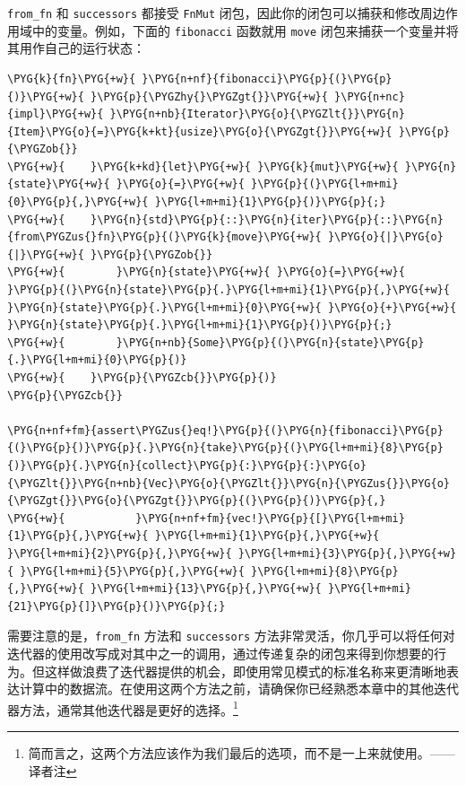 \texttt{from\_fn} 和 \texttt{successors} 都接受 \texttt{FnMut} 闭包，因此你的闭包可以捕获和修改周边作用域中的变量。例如，下面的 \texttt{fibonacci} 函数就用 \texttt{move} 闭包来捕获一个变量并将其用作自己的运行状态：

\begin{Verbatim}[commandchars=\\\{\},breaklines=true,breakanywhere=true,fontsize=\codefont,xleftmargin=17bp]
\PYG{k}{fn}\PYG{+w}{ }\PYG{n+nf}{fibonacci}\PYG{p}{(}\PYG{p}{)}\PYG{+w}{ }\PYG{p}{\PYGZhy{}\PYGZgt{}}\PYG{+w}{ }\PYG{n+nc}{impl}\PYG{+w}{ }\PYG{n+nb}{Iterator}\PYG{o}{\PYGZlt{}}\PYG{n}{Item}\PYG{o}{=}\PYG{k+kt}{usize}\PYG{o}{\PYGZgt{}}\PYG{+w}{ }\PYG{p}{\PYGZob{}}
\PYG{+w}{    }\PYG{k+kd}{let}\PYG{+w}{ }\PYG{k}{mut}\PYG{+w}{ }\PYG{n}{state}\PYG{+w}{ }\PYG{o}{=}\PYG{+w}{ }\PYG{p}{(}\PYG{l+m+mi}{0}\PYG{p}{,}\PYG{+w}{ }\PYG{l+m+mi}{1}\PYG{p}{)}\PYG{p}{;}
\PYG{+w}{    }\PYG{n}{std}\PYG{p}{::}\PYG{n}{iter}\PYG{p}{::}\PYG{n}{from\PYGZus{}fn}\PYG{p}{(}\PYG{k}{move}\PYG{+w}{ }\PYG{o}{|}\PYG{o}{|}\PYG{+w}{ }\PYG{p}{\PYGZob{}}
\PYG{+w}{        }\PYG{n}{state}\PYG{+w}{ }\PYG{o}{=}\PYG{+w}{ }\PYG{p}{(}\PYG{n}{state}\PYG{p}{.}\PYG{l+m+mi}{1}\PYG{p}{,}\PYG{+w}{ }\PYG{n}{state}\PYG{p}{.}\PYG{l+m+mi}{0}\PYG{+w}{ }\PYG{o}{+}\PYG{+w}{ }\PYG{n}{state}\PYG{p}{.}\PYG{l+m+mi}{1}\PYG{p}{)}\PYG{p}{;}
\PYG{+w}{        }\PYG{n+nb}{Some}\PYG{p}{(}\PYG{n}{state}\PYG{p}{.}\PYG{l+m+mi}{0}\PYG{p}{)}
\PYG{+w}{    }\PYG{p}{\PYGZcb{}}\PYG{p}{)}
\PYG{p}{\PYGZcb{}}

\PYG{n+nf+fm}{assert\PYGZus{}eq!}\PYG{p}{(}\PYG{n}{fibonacci}\PYG{p}{(}\PYG{p}{)}\PYG{p}{.}\PYG{n}{take}\PYG{p}{(}\PYG{l+m+mi}{8}\PYG{p}{)}\PYG{p}{.}\PYG{n}{collect}\PYG{p}{:}\PYG{p}{:}\PYG{o}{\PYGZlt{}}\PYG{n+nb}{Vec}\PYG{o}{\PYGZlt{}}\PYG{n}{\PYGZus{}}\PYG{o}{\PYGZgt{}}\PYG{o}{\PYGZgt{}}\PYG{p}{(}\PYG{p}{)}\PYG{p}{,}
\PYG{+w}{           }\PYG{n+nf+fm}{vec!}\PYG{p}{[}\PYG{l+m+mi}{1}\PYG{p}{,}\PYG{+w}{ }\PYG{l+m+mi}{1}\PYG{p}{,}\PYG{+w}{ }\PYG{l+m+mi}{2}\PYG{p}{,}\PYG{+w}{ }\PYG{l+m+mi}{3}\PYG{p}{,}\PYG{+w}{ }\PYG{l+m+mi}{5}\PYG{p}{,}\PYG{+w}{ }\PYG{l+m+mi}{8}\PYG{p}{,}\PYG{+w}{ }\PYG{l+m+mi}{13}\PYG{p}{,}\PYG{+w}{ }\PYG{l+m+mi}{21}\PYG{p}{]}\PYG{p}{)}\PYG{p}{;}
\end{Verbatim}

需要注意的是，\texttt{from\_fn} 方法和 \texttt{successors} 方法非常灵活，你几乎可以将任何对迭代器的使用改写成对其中之一的调用，通过传递复杂的闭包来得到你想要的行为。但这样做浪费了迭代器提供的机会，即使用常见模式的标准名称来更清晰地表达计算中的数据流。在使用这两个方法之前，请确保你已经熟悉本章中的其他迭代器方法，通常其他迭代器是更好的选择。\footnote{简而言之，这两个方法应该作为我们最后的选项，而不是一上来就使用。——译者注}

